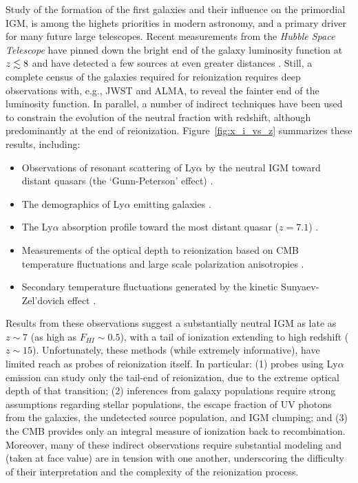 \documentclass[preprint]{aastex}
\begin{document}
Study of the formation of the first galaxies and their influence on the primordial IGM, is 
among the highets priorities in modern astronomy, 
and a primary driver for many future large telescopes.  Recent measurements from the {\it Hubble Space Telescope} 
have pinned down the bright end of the galaxy luminosity function 
at $z \lesssim 8$ \citep{bouwens_et_al2010, schenker_et_al2013} and have detected a few sources at even greater 
distances \citep{ellis_et_al2013, oesch_et_al2013}. Still, a complete census of the galaxies required for
reionization requires deep observations with, e.g., JWST and ALMA, to reveal the fainter end of the luminosity function. 
In parallel, a number of indirect techniques have been used to constrain the evolution of the neutral fraction
with redshift, although predominantly at the end of reionization. Figure~\ref{fig:x_i_vs_z} summarizes 
these results, including: 

\begin{itemize}[noitemsep,nolistsep]

\item Observations of resonant scattering of Ly$\alpha$ by the neutral IGM toward
distant quasars (the `Gunn-Peterson' effect) \citep{fan_et_al2006}.

\item The demographics of Ly$\alpha$ emitting  galaxies \citep{schenker_et_al2012, treu_et_al2013,Faisst_et_al2014}.

\item The Ly$\alpha$ absorption profile toward the most distant quasar ($z = 7.1$) \citep{bolton_et_al2011}.

\item Measurements of the optical depth to reionization based on CMB temperature fluctuations \citep{planck_et_al2013}
and large scale polarization anisotropies \citep{page_et_al2007}.

\item Secondary temperature fluctuations generated by the kinetic Sunyaev-Zel'dovich effect \citep{zahn_et_al2012_trunc, mesinger_et_al2012}. 

\end{itemize}
\noindent
Results from these observations suggest a substantially neutral IGM as late as $z \sim 7$ (as high as $F_{HI} \sim 0.5$), with a tail of ionization extending to high 
redshift ($z \sim 15$).  Unfortunately, these methods (while extremely informative), have limited 
reach as probes of reionization itself. In particular:
(1) probes using Ly$\alpha$ emission can study only the tail-end of reionization, 
due to the extreme optical depth of that transition; (2) inferences from galaxy populations require strong assumptions 
regarding stellar populations, the escape fraction of UV photons from the galaxies, the undetected source population, 
and IGM clumping; and (3) the CMB provides only an integral measure of ionization back to recombination. 
Moreover, many of these indirect observations require substantial modeling and (taken at face value) 
are in tension with one another, underscoring the difficulty of
their interpretation and the complexity of the reionization process.
\end{document}
